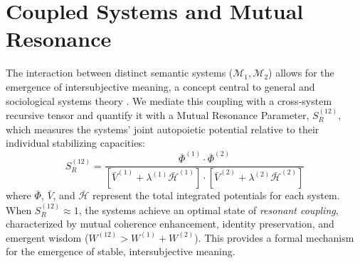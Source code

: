 
\section{Coupled Systems and Mutual Resonance}
\label{sec:coupled_systems_and_mutual_resonance}

The interaction between distinct semantic systems (\(\mathcal{M}_1, \mathcal{M}_2\)) allows for the emergence of intersubjective meaning, a concept central to general and sociological systems theory \autocite{vonBertalanffy1968, Luhmann1995}. We mediate this coupling with a cross-system recursive tensor and quantify it with a Mutual Resonance Parameter, \(S_R^{(12)}\), which measures the systems' joint autopoietic potential relative to their individual stabilizing capacities:
\begin{equation}
S_R^{(12)} = \frac{\bar{\Phi}^{(1)} \cdot \bar{\Phi}^{(2)}}{[\bar{V}^{(1)} + \lambda^{(1)} \bar{\mathcal{H}}^{(1)}] \cdot [\bar{V}^{(2)} + \lambda^{(2)} \bar{\mathcal{H}}^{(2)}]}
\end{equation}
where \(\bar{\Phi}\), \(\bar{V}\), and \(\bar{\mathcal{H}}\) represent the total integrated potentials for each system. When \(S_R^{(12)} \approx 1\), the systems achieve an optimal state of \textit{resonant coupling}, characterized by mutual coherence enhancement, identity preservation, and emergent wisdom (\(W^{(12)} > W^{(1)} + W^{(2)}\)). This provides a formal mechanism for the emergence of stable, intersubjective meaning.
